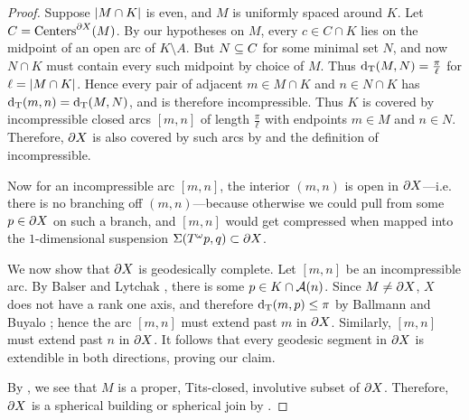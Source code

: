 \documentclass{amsart}
\begin{document}
\begin{proof}
Suppose $\left| M \cap K \right|$ is even, and $M$ is uniformly spaced around $K$.  Let $C = \operatorname{Centers}^{\partial X} (M)$.  By our hypotheses on $M$, every $c \in C \cap K$ lies on the midpoint of an open arc of $K \setminus A$.  But $N \subseteq C$ for some minimal set $N$, and now $N \cap K$ must contain every such midpoint by choice of $M$.  Thus $\operatorname{d_T}(M,N) = \frac{\pi}{\ell}$ for $\ell = \left| M \cap K \right|$.  Hence every pair of adjacent $m \in M \cap K$ and $n \in N \cap K$ has $\operatorname{d_T}(m,n) = \operatorname{d_T}(M,N)$, and is therefore incompressible.  Thus $K$ is covered by incompressible closed arcs $[m,n]$ of length $\frac{\pi}{\ell}$ with endpoints $m \in M$ and $n \in N$.  Therefore, $\partial X$ is also covered by such arcs by  and the definition of incompressible.

Now for an incompressible arc $[m,n]$, the interior $(m,n)$ is open in $\partial X$---i.e. there is no branching off $(m,n)$---because otherwise we could pull from some $p \in \partial X$ on such a branch, and $[m,n]$ would get compressed when mapped into the $1$-dimensional suspension $\operatorname{\Sigma} (T^\omega p, q) \subset \partial X$.

We now show that $\partial X$ is geodesically complete.  Let $[m,n]$ be an incompressible arc.  By Balser and Lytchak \cite[Lemma 3.1]{bl-centers}, there is some $p \in K \cap \operatorname{\mathcal A}(n)$.  Since $M \neq \partial X$, $X$ does not have a rank one axis, and therefore $\operatorname{d_T}(m,p) \le \pi$ by Ballmann and Buyalo \cite[Proposition 1.10]{bb}; hence the arc $[m,n]$ must extend past $m$ in $\partial X$.  Similarly, $[m,n]$ must extend past $n$ in $\partial X$.  It follows that every geodesic segment in $\partial X$ is extendible in both directions, proving our claim.

By , we see that $M$ is a proper, Tits-closed, involutive subset of $\partial X$.  Therefore, $\partial X$ is a spherical building or spherical join by .
\end{proof}
\end{document}
